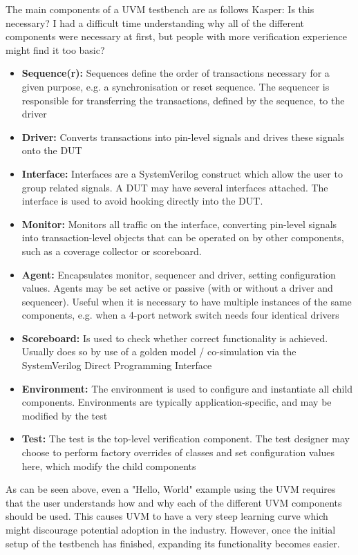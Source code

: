 \documentclass[a4paper, conference]{IEEEtran}
\newcommand{\kasper}[1]{{\color{purple} Kasper: #1}}
\begin{document}
The main components of a UVM testbench are as follows
\kasper{Is this necessary? I had a difficult time understanding why all of the different components were necessary at first, but people with more verification experience might find it too basic?}
\begin{itemize}
    \item \textbf{Sequence(r):} Sequences define the order of transactions necessary for a given purpose, e.g. a synchronisation or reset sequence. The sequencer is responsible for transferring the transactions, defined by the sequence, to the driver
    \item \textbf{Driver:} Converts transactions into pin-level signals and drives these signals onto the DUT
    \item \textbf{Interface:} Interfaces are a SystemVerilog construct which allow the user to group related signals. A DUT may have several interfaces attached. The interface is used to avoid hooking directly into the DUT. 
    \item \textbf{Monitor:} Monitors all traffic on the interface, converting pin-level signals into transaction-level objects that can be operated on by other components, such as a coverage collector or scoreboard. 
    \item \textbf{Agent:} Encapsulates monitor, sequencer and driver, setting configuration values. Agents may be set active or passive (with or without a driver and sequencer). Useful when it is necessary to have multiple instances of the same components, e.g. when a 4-port network switch needs four identical drivers
    \item \textbf{Scoreboard:} Is used to check whether correct functionality is achieved. Usually does so by use of a golden model / co-simulation via the SystemVerilog Direct Programming Interface
    \item \textbf{Environment:} The environment is used to configure and instantiate all child components. Environments are typically application-specific, and may be modified by the test
    \item \textbf{Test:} The test is the top-level verification component. The test designer may choose to perform factory overrides of classes and set configuration values here, which modify the child components
\end{itemize}

As can be seen above, even a "Hello, World" example using the UVM requires that the user understands how and why each of the different UVM components should be used. This causes UVM to have a very steep learning curve which might discourage potential adoption in the industry. However, once the initial setup of the testbench has finished, expanding its functionality becomes easier.
\end{document}
